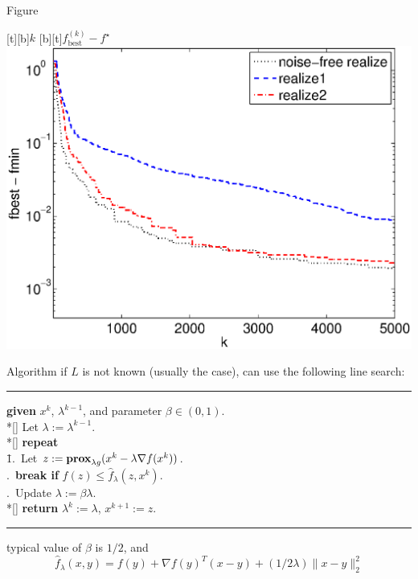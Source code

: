 \documentclass[10pt,tgadventor, onlymath]{beamer}
\begin{document}
\begin{frame}{Figure}
\begin{center}
[t][b]{$k$}
[b][t]{$f_\mathrm{best}^{(k)} - f^\star$}
\includegraphics[height=0.8\textheight]{figures/pwl_error_fbest_realize.eps}
\end{center}
\end{frame}

\begin{frame}{Algorithm}
    if $L$ is not known (usually the case), can use the following line search:
    \noindent\rule[-5pt]{\textwidth}{0.4pt}
    {\footnotesize
    \begin{tabbing}
        {\bf given} $x^k$, $\lambda^{k-1}$, and parameter $\beta \in (0,1)$. \\*[\smallskipamount]
        Let $\lambda := \lambda^{k-1}$. \\*[\smallskipamount]
        {\bf repeat} \\
        \qquad \= 1.\ Let $z := \mathbf{prox}_{\lambda g}(x^{k} - \lambda \nabla f(x^{k}))$. \\
        .\ {\bf break if} $f(z) \leq \hat{f}_{\lambda}(z, x^{k})$. \\
        .\ Update $\lambda := \beta \lambda$. \\*[\smallskipamount]
        {\bf return} $\lambda^{k} := \lambda$, $x^{k+1}:=z$.
    \end{tabbing}}
    \noindent\rule[10pt]{\textwidth}{0.4pt}

    typical value of $\beta$ is $1/2$, and 
    \[
    \hat{f}_\lambda(x,y) = f(y) + \nabla f(y)^T (x - y) + 
    (1/2\lambda)\|x - y\|_2^2
    \]
\end{frame}
\end{document}
